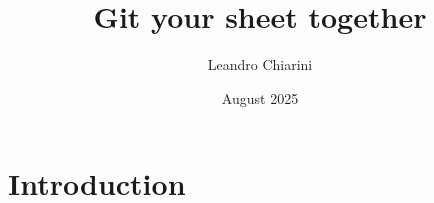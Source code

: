 \documentclass{article}
\title{Git your sheet together}
\author{Leandro Chiarini}
\date{August 2025}
\begin{document}
\maketitle

\section{Introduction}
\end{document}
